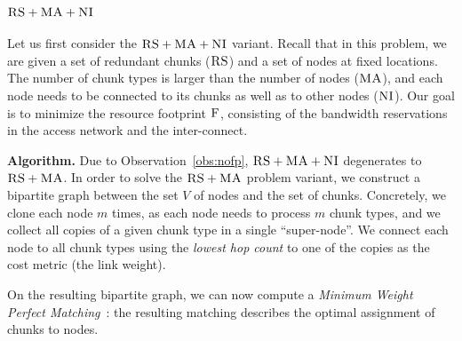 \documentclass[9pt]{sigcomm-alternate}
\newcommand{\MaFactor}{m}
\newcommand{\ChunkType}{\tau}
\newcommand{\VirtualNodes}{\ensuremath{V}}
\newcommand{\CC}{\textsc{NI}}
\newcommand{\RS}{\textsc{RS}}
\newcommand{\MA}{\textsc{MA}}
\newcommand{\Cost}{\textsc{F}}
\begin{document}
\subsubsection{$\RS+\MA+\CC$}

Let us first consider the $\RS+\MA+\CC$ variant.
Recall that in this problem,
we are given a set of redundant chunks ($\RS$) and a set of nodes
at fixed locations. The number of chunk types is larger than the number
of nodes ($\MA$), and each node needs to be connected
to its chunks as well as to other nodes ($\CC$).
Our goal is to minimize the resource footprint $\Cost$, consisting
of the bandwidth reservations in the access network and the inter-connect.

\textbf{Algorithm.} Due to Observation~\ref{obs:nofp}, $\RS+\MA+\CC$ degenerates to $\RS+\MA$.
In order to solve the $\RS+\MA$ problem variant,
we construct a bipartite
graph between the set
$\VirtualNodes$ of nodes and
the set of chunks.
Concretely, we clone each node $\MaFactor$ times,
as each node needs to process
$\MaFactor$ chunk types, and we collect all copies of a given chunk type in a
single %
``super-node''. We connect each node to all chunk types using the
\emph{lowest hop count} to one of the copies as the cost metric (the link weight).

On the resulting bipartite graph, we can now compute a \emph{Minimum Weight
Perfect
Matching}~\cite{gabow_scaling_algorithm}:
the resulting matching describes the optimal assignment of chunks to nodes.

\end{document}
